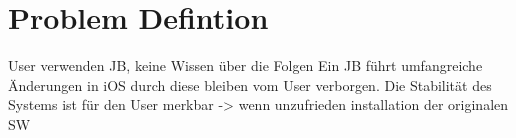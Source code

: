 \section{Problem Defintion}
\label{sec:IntroProblem}
User verwenden JB, keine Wissen über die Folgen
Ein JB führt umfangreiche Änderungen in iOS durch diese bleiben vom User verborgen.
Die Stabilität des Systems ist für den User merkbar -> wenn unzufrieden installation der originalen SW

               


